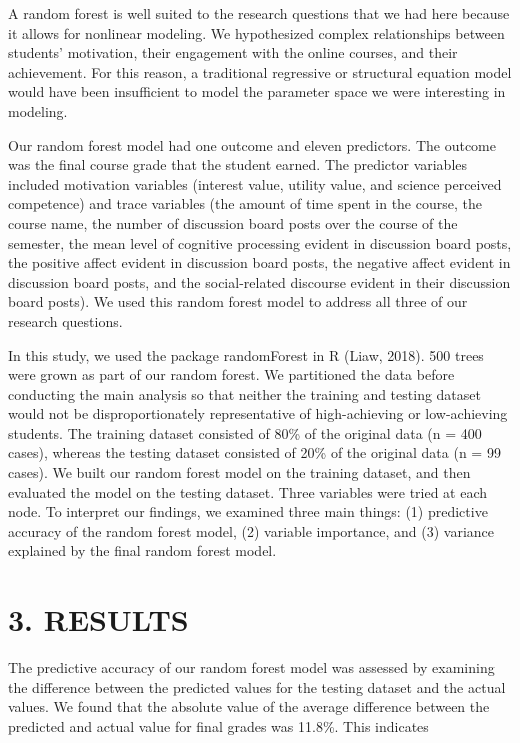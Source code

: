 \documentclass[acmart]{apa6}
\theoremstyle{definition}
\theoremstyle{definition}
\theoremstyle{definition}
\theoremstyle{remark}
\begin{document}
A random forest is well suited to the research questions that we had
here because it allows for nonlinear modeling. We hypothesized complex
relationships between students' motivation, their engagement with the
online courses, and their achievement. For this reason, a traditional
regressive or structural equation model would have been insufficient to
model the parameter space we were interesting in modeling.

Our random forest model had one outcome and eleven predictors. The
outcome was the final course grade that the student earned. The
predictor variables included motivation variables (interest value,
utility value, and science perceived competence) and trace variables
(the amount of time spent in the course, the course name, the number of
discussion board posts over the course of the semester, the mean level
of cognitive processing evident in discussion board posts, the positive
affect evident in discussion board posts, the negative affect evident in
discussion board posts, and the social-related discourse evident in
their discussion board posts). We used this random forest model to
address all three of our research questions.

In this study, we used the package randomForest in R (Liaw, 2018). 500
trees were grown as part of our random forest. We partitioned the data
before conducting the main analysis so that neither the training and
testing dataset would not be disproportionately representative of
high-achieving or low-achieving students. The training dataset consisted
of 80\% of the original data (n = 400 cases), whereas the testing
dataset consisted of 20\% of the original data (n = 99 cases). We built
our random forest model on the training dataset, and then evaluated the
model on the testing dataset. Three variables were tried at each node.
To interpret our findings, we examined three main things: (1) predictive
accuracy of the random forest model, (2) variable importance, and (3)
variance explained by the final random forest model.

\section{3. RESULTS}\label{results}

The predictive accuracy of our random forest model was assessed by
examining the difference between the predicted values for the testing
dataset and the actual values. We found that the absolute value of the
average difference between the predicted and actual value for final
grades was 11.8\%. This indicates
\end{document}
